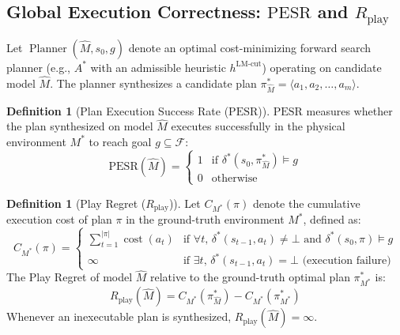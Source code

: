 \documentclass[11pt,a4paper]{article}
\theoremstyle{definition}
\newtheorem{definition}[theorem]{Definition}
\theoremstyle{remark}
\begin{document}
\subsection{Global Execution Correctness: \texorpdfstring{$\text{PESR}$}{PESR} and \texorpdfstring{$R_{\text{play}}$}{R_play}}

Let $\operatorname{Planner}(\widehat{M}, s_0, g)$ denote an optimal cost-minimizing forward search planner (e.g., $A^*$ with an admissible heuristic $h^{\text{LM-cut}}$) operating on candidate model $\widehat{M}$. The planner synthesizes a candidate plan $\pi^*_{\widehat{M}} = \langle a_1, a_2, \dots, a_m \rangle$.

\begin{definition}[Plan Execution Success Rate ($\text{PESR}$)]
$\text{PESR}$ measures whether the plan synthesized on model $\widehat{M}$ executes successfully in the physical environment $M^*$ to reach goal $g \subseteq \mathcal{F}$:
\begin{equation}
    \text{PESR}(\widehat{M}) = \begin{cases}
        1 & \text{if } \delta^*(s_0, \pi^*_{\widehat{M}}) \models g \\
        0 & \text{otherwise}
    \end{cases}
\end{equation}
\end{definition}

\begin{definition}[Play Regret ($R_{\text{play}}$)]
Let $C_{M^*}(\pi)$ denote the cumulative execution cost of plan $\pi$ in the ground-truth environment $M^*$, defined as:
\begin{equation}
    C_{M^*}(\pi) = \begin{cases}
        \sum_{t=1}^{|\pi|} \operatorname{cost}(a_t) & \text{if } \forall t,\, \delta^*(s_{t-1}, a_t) \ne \bot \text{ and } \delta^*(s_0, \pi) \models g \\
        \infty & \text{if } \exists t,\, \delta^*(s_{t-1}, a_t) = \bot \text{ (execution failure)}
    \end{cases}
\end{equation}
The Play Regret of model $\widehat{M}$ relative to the ground-truth optimal plan $\pi^*_{M^*}$ is:
\begin{equation}
    R_{\text{play}}(\widehat{M}) = C_{M^*}(\pi^*_{\widehat{M}}) - C_{M^*}(\pi^*_{M^*})
\end{equation}
Whenever an inexecutable plan is synthesized, $R_{\text{play}}(\widehat{M}) = \infty$.
\end{definition}
\end{document}
